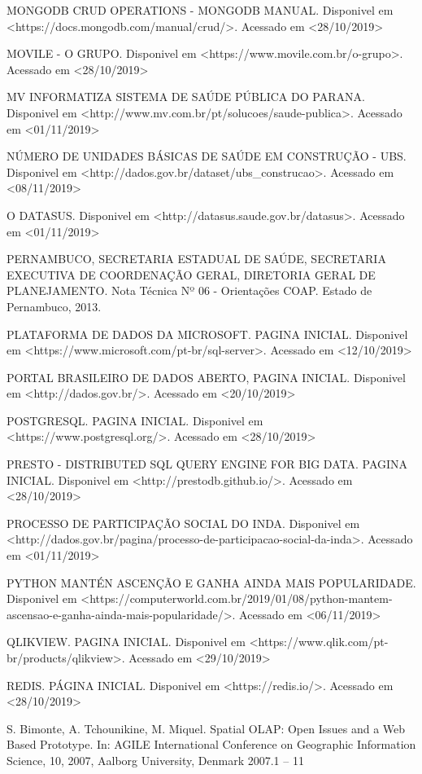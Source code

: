 \documentclass[
	12pt,				%
	openright,			%
	oneside,			%
	a4paper,			%
	chapter=TITLE,		%
	section=TITLE,		%
	subsection=TITLE,	%
	subsubsection=TITLE,%
	english,			%
	brazil				%
	]{abntex2}
\theoremstyle{definition}
\begin{document}
MONGODB CRUD OPERATIONS - MONGODB MANUAL. Disponivel em <https://docs.mongodb.com/manual/crud/>. Acessado em <28/10/2019>

MOVILE - O GRUPO. Disponivel em <https://www.movile.com.br/o-grupo>. Acessado em <28/10/2019>

MV INFORMATIZA SISTEMA DE SAÚDE PÚBLICA DO PARANA. Disponivel em <http://www.mv.com.br/pt/solucoes/saude-publica>. Acessado em <01/11/2019>

NÚMERO DE UNIDADES BÁSICAS DE SAÚDE EM CONSTRUÇÃO - UBS. Disponivel em <http://dados.gov.br/dataset/ubs_construcao>. Acessado em <08/11/2019>

O DATASUS. Disponivel em <http://datasus.saude.gov.br/datasus>. Acessado em <01/11/2019>

PERNAMBUCO, SECRETARIA ESTADUAL DE SAÚDE, SECRETARIA EXECUTIVA DE COORDENAÇÃO GERAL, DIRETORIA GERAL DE PLANEJAMENTO. Nota Técnica Nº 06 - Orientações COAP. Estado de Pernambuco, 2013.

PLATAFORMA DE DADOS DA MICROSOFT. PAGINA INICIAL. Disponivel em <https://www.microsoft.com/pt-br/sql-server>. Acessado em <12/10/2019>

PORTAL BRASILEIRO DE DADOS ABERTO, PAGINA INICIAL. Disponivel em <http://dados.gov.br/>. Acessado em <20/10/2019>

POSTGRESQL. PAGINA INICIAL. Disponivel em <https://www.postgresql.org/>. Acessado em <28/10/2019>

PRESTO - DISTRIBUTED SQL QUERY ENGINE FOR BIG DATA. PAGINA INICIAL. Disponivel em <http://prestodb.github.io/>. Acessado em <28/10/2019>

PROCESSO DE PARTICIPAÇÃO SOCIAL DO INDA. Disponivel em <http://dados.gov.br/pagina/processo-de-participacao-social-da-inda>. Acessado em <01/11/2019>

PYTHON MANTÉN ASCENÇÃO E GANHA AINDA MAIS POPULARIDADE. Disponivel em <https://computerworld.com.br/2019/01/08/python-mantem-ascensao-e-ganha-ainda-mais-popularidade/>. Acessado em <06/11/2019>

QLIKVIEW. PAGINA INICIAL. Disponivel em <https://www.qlik.com/pt-br/products/qlikview>. Acessado em <29/10/2019>

REDIS. PÁGINA INICIAL. Disponivel em <https://redis.io/>. Acessado em <28/10/2019>

S. Bimonte, A. Tchounikine, M. Miquel. Spatial OLAP: Open Issues and a Web Based Prototype. In: AGILE International Conference on Geographic Information Science, 10, 2007, Aalborg University, Denmark 2007.1 – 11
\end{document}
